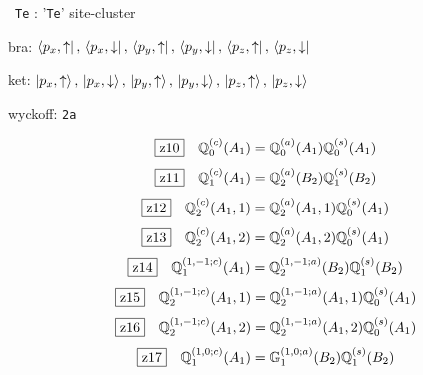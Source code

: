 \documentclass[fleqn,10pt,landscape]{jsarticle}
\begin{document}
\noindent\textbullet\, \texttt{Te} : '\texttt{Te}' site-cluster

\noindent\quad * bra: $\bra{p_{x},\uparrow},\, \bra{p_{x},\downarrow},\, \bra{p_{y},\uparrow},\, \bra{p_{y},\downarrow},\, \bra{p_{z},\uparrow},\, \bra{p_{z},\downarrow}$

\noindent\quad * ket: $\ket{p_{x},\uparrow},\, \ket{p_{x},\downarrow},\, \ket{p_{y},\uparrow},\, \ket{p_{y},\downarrow},\, \ket{p_{z},\uparrow},\, \ket{p_{z},\downarrow}$

\noindent\quad * wyckoff: \texttt{2a}

\begin{dmath*}
\hspace*{3mm}\fbox{z10}\quad \mathbb{Q}_{0}^{(c)}(A_{1})=\mathbb{Q}_{0}^{(a)}(A_{1}) \mathbb{Q}_{0}^{(s)}(A_{1})
\end{dmath*}
\begin{dmath*}
\hspace*{3mm}\fbox{z11}\quad \mathbb{Q}_{1}^{(c)}(A_{1})=\mathbb{Q}_{2}^{(a)}(B_{2}) \mathbb{Q}_{1}^{(s)}(B_{2})
\end{dmath*}
\begin{dmath*}
\hspace*{3mm}\fbox{z12}\quad \mathbb{Q}_{2}^{(c)}(A_{1},1)=\mathbb{Q}_{2}^{(a)}(A_{1},1) \mathbb{Q}_{0}^{(s)}(A_{1})
\end{dmath*}
\begin{dmath*}
\hspace*{3mm}\fbox{z13}\quad \mathbb{Q}_{2}^{(c)}(A_{1},2)=\mathbb{Q}_{2}^{(a)}(A_{1},2) \mathbb{Q}_{0}^{(s)}(A_{1})
\end{dmath*}
\begin{dmath*}
\hspace*{3mm}\fbox{z14}\quad \mathbb{Q}_{1}^{(1,-1;c)}(A_{1})=\mathbb{Q}_{2}^{(1,-1;a)}(B_{2}) \mathbb{Q}_{1}^{(s)}(B_{2})
\end{dmath*}
\begin{dmath*}
\hspace*{3mm}\fbox{z15}\quad \mathbb{Q}_{2}^{(1,-1;c)}(A_{1},1)=\mathbb{Q}_{2}^{(1,-1;a)}(A_{1},1) \mathbb{Q}_{0}^{(s)}(A_{1})
\end{dmath*}
\begin{dmath*}
\hspace*{3mm}\fbox{z16}\quad \mathbb{Q}_{2}^{(1,-1;c)}(A_{1},2)=\mathbb{Q}_{2}^{(1,-1;a)}(A_{1},2) \mathbb{Q}_{0}^{(s)}(A_{1})
\end{dmath*}
\begin{dmath*}
\hspace*{3mm}\fbox{z17}\quad \mathbb{Q}_{1}^{(1,0;c)}(A_{1})=\mathbb{G}_{1}^{(1,0;a)}(B_{2}) \mathbb{Q}_{1}^{(s)}(B_{2})
\end{dmath*}
\end{document}
